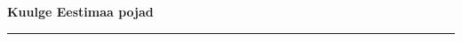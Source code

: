 \documentclass[10pt]{book}
\begin{document}
{
  \samepage
  \raggedbottom
  \raggedright
  \sloppy


  \vspace{0.2in}

  \noindent\begin{minipage}{.1\textwidth}
    \hfill\vspace{0.1in}
  \end{minipage}%
  \noindent\begin{minipage}{.8\textwidth}
    \centering
    \bfseries
    \large Kuulge Eestimaa pojad
  \end{minipage}%
  \noindent\begin{minipage}{.1\textwidth}
      \hfill\vspace{0.1in}
  \end{minipage}

  \nopagebreak[4]
  \vspace{0.1in}
  \nopagebreak[4]
  \hrule height 0.05ex
  \nopagebreak[4]
  \vspace{-0.05in}




}
\end{document}
